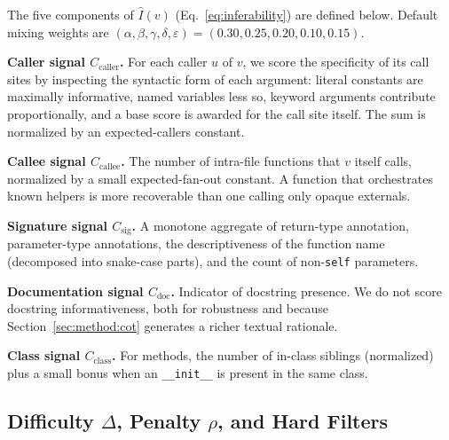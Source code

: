 The five components of $\hat{I}(v)$ (Eq.~\ref{eq:inferability}) are
defined below. Default mixing weights are
$(\alpha,\beta,\gamma,\delta,\varepsilon) = (0.30, 0.25, 0.20, 0.10, 0.15)$.

\textbf{Caller signal $C_{\mathrm{caller}}$.}
For each caller $u$ of $v$, we score the specificity of its call sites
by inspecting the syntactic form of each argument: literal constants are
maximally informative, named variables less so, keyword arguments
contribute proportionally, and a base score is awarded for the call
site itself. The sum is normalized by an expected-callers constant.

\textbf{Callee signal $C_{\mathrm{callee}}$.}
The number of intra-file functions that $v$ itself calls, normalized by
a small expected-fan-out constant. A function that orchestrates known
helpers is more recoverable than one calling only opaque externals.

\textbf{Signature signal $C_{\mathrm{sig}}$.}
A monotone aggregate of return-type annotation, parameter-type
annotations, the descriptiveness of the function name (decomposed into
snake-case parts), and the count of non-\texttt{self} parameters.

\textbf{Documentation signal $C_{\mathrm{doc}}$.}
Indicator of docstring presence. We do not score docstring
informativeness, both for robustness and because
Section~\ref{sec:method:cot} generates a richer textual rationale.

\textbf{Class signal $C_{\mathrm{class}}$.}
For methods, the number of in-class siblings (normalized) plus a small
bonus when an \texttt{\_\_init\_\_} is present in the same class.

\subsection{Difficulty $\Delta$, Penalty $\rho$, and Hard Filters}
\label{app:algo:penalty}

